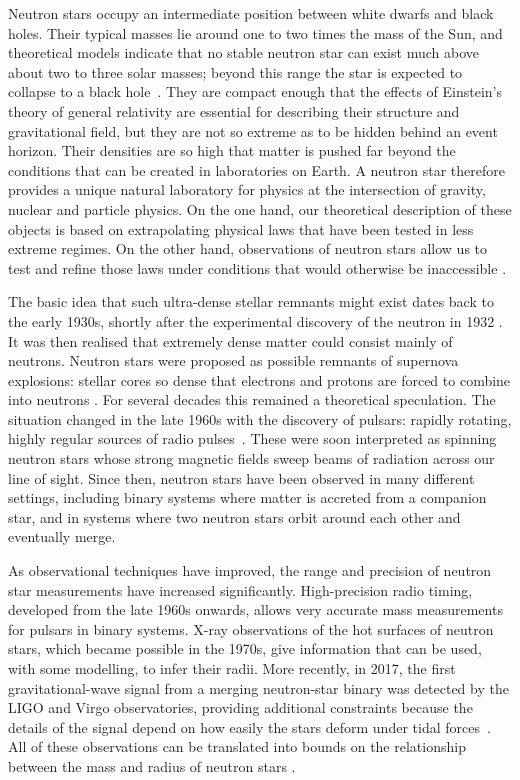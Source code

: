 Neutron stars occupy an intermediate position between white dwarfs and black
holes. Their typical masses lie around one to two times the mass of the Sun,
and theoretical models indicate that no stable neutron star can exist much
above about two to three solar masses; beyond this range the star is expected
to collapse to a black hole~\cite{LattimerPrakash2004}.
They are compact enough that the effects of
Einstein's theory of general relativity are essential for describing their
structure and gravitational field, but they are not so extreme as to be hidden
behind an event horizon. Their densities are so high that matter is pushed far
beyond the conditions that can be created in laboratories on Earth. A neutron
star therefore provides a unique natural laboratory for physics at the
intersection of gravity, nuclear and particle physics. On the one hand, our
theoretical description of these objects is based on extrapolating physical
laws that have been tested in less extreme regimes. On the other hand,
observations of neutron stars allow us to test and refine those laws under
conditions that would otherwise be inaccessible \cite{LattimerPrakash2004}.

The basic idea that such ultra-dense stellar remnants might exist dates back to
the early 1930s, shortly after the experimental discovery of the neutron in
1932 \cite{Chadwick1932}.
It was then realised that extremely dense matter could consist mainly of
neutrons. Neutron stars were proposed as possible remnants of supernova
explosions: stellar cores so dense that electrons and protons are forced to
combine into neutrons \cite{BaadeZwicky1934}.
For several decades this remained a theoretical
speculation. The situation changed in the late 1960s with the discovery of
pulsars: rapidly rotating, highly regular sources of radio pulses~\cite{Hewish1968}.
These were
soon interpreted as spinning neutron stars whose strong magnetic fields sweep
beams of radiation across our line of sight. Since then, neutron stars have
been observed in many different settings, including binary systems where matter
is accreted from a companion star, and in systems where two neutron stars orbit
around each other and eventually merge.

As observational techniques have improved, the range and precision of neutron
star measurements have increased significantly. High-precision radio timing,
developed from the late 1960s onwards, allows very accurate mass measurements
for pulsars in binary systems. X-ray observations of the hot surfaces of
neutron stars, which became possible in the 1970s, give information that can be
used, with some modelling, to infer their radii. More recently, in 2017, the
first gravitational-wave signal from a merging neutron-star binary was detected
by the LIGO and Virgo observatories, providing additional constraints because
the details of the signal depend on how easily the stars deform under tidal
forces~\cite{Abbott2017GW170817}.
All of these observations can be translated into bounds on the
relationship between the mass and radius of neutron stars \cite{LattimerPrakash2004}.

